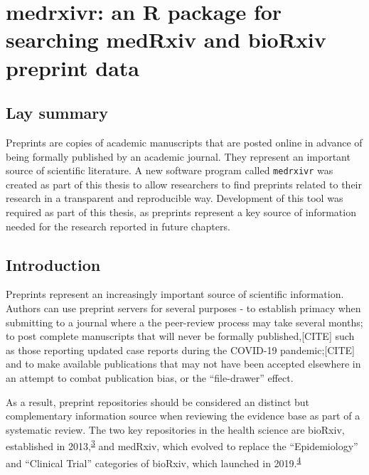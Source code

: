 \documentclass[a4paper, twoside]{templates/ociamthesis}
\begin{document}
\hypertarget{sys-rev-tools-heading}{%
\chapter{medrxivr: an R package for searching medRxiv and bioRxiv preprint data}\label{sys-rev-tools-heading}}

\minitoc 

\hypertarget{lay-summary}{%
\section{Lay summary}\label{lay-summary}}

Preprints are copies of academic manuscripts that are posted online in advance of being formally published by an academic journal.
They represent an important source of scientific literature.
A new software program called \texttt{medrxivr} was created as part of this thesis to allow researchers to find preprints related to their research in a transparent and reproducible way.
Development of this tool was required as part of this thesis, as preprints represent a key source of information needed for the research reported in future chapters.

\hypertarget{introduction}{%
\section{Introduction}\label{introduction}}

Preprints represent an increasingly important source of scientific information. Authors can use preprint servers for several purposes - to establish primacy when submitting to a journal where a the peer-review process may take several months; to post complete manuscripts that will never be formally published,{[}CITE{]} such as those reporting updated case reports during the COVID-19 pandemic;{[}CITE{]} and to make available publications that may not have been accepted elsewhere in an attempt to combat publication bias, or the ``file-drawer'' effect.

As a result, preprint repositories should be considered an distinct but complementary information source when reviewing the evidence base as part of a systematic review. The two key repositories in the health science are bioRxiv, established in 2013,\textsuperscript{\protect\hyperlink{ref-sever2019}{3}} and medRxiv, which evolved to replace the ``Epidemiology'' and ``Clinical Trial'' categories of bioRxiv, which launched in 2019.\textsuperscript{\protect\hyperlink{ref-rawlinson2019}{4}}
\end{document}
